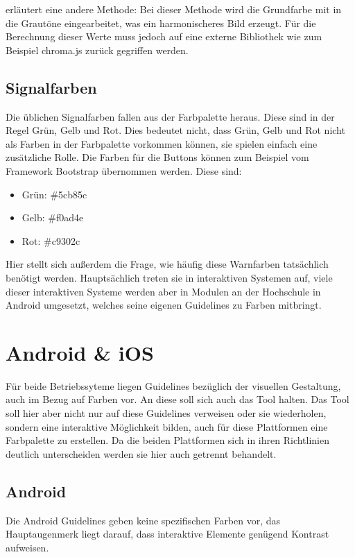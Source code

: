 \cite{elizabeth2016simple} erläutert eine andere Methode: Bei dieser Methode wird die Grundfarbe mit in die Grautöne eingearbeitet, was ein harmonischeres Bild erzeugt.  Für die Berechnung dieser Werte muss jedoch auf eine externe Bibliothek wie zum Beispiel chroma.js zurück gegriffen werden.

\subsection{Signalfarben}
Die üblichen Signalfarben fallen aus der Farbpalette heraus. Diese sind in der Regel Grün, Gelb und Rot. Dies bedeutet nicht, dass Grün, Gelb und Rot nicht als Farben in der Farbpalette vorkommen können, sie spielen einfach eine zusätzliche Rolle. Die Farben für die Buttons können zum Beispiel vom Framework Bootstrap übernommen werden. Diese sind:

\begin{itemize}
  \item Grün: \#5cb85c
  \item Gelb: \#f0ad4e
  \item Rot: \#c9302c
\end{itemize}

Hier stellt sich außerdem die Frage, wie häufig diese Warnfarben tatsächlich benötigt werden. Hauptsächlich treten sie in interaktiven Systemen auf, viele dieser interaktiven Systeme werden aber in Modulen an der Hochschule in Android umgesetzt, welches seine eigenen Guidelines zu Farben mitbringt.


\section{Android \& iOS}

Für beide Betriebssyteme liegen Guidelines bezüglich der visuellen Gestaltung, auch im Bezug auf Farben vor. An diese soll sich auch das Tool halten. Das Tool soll hier aber nicht nur auf diese Guidelines verweisen oder sie wiederholen, sondern eine interaktive Möglichkeit bilden, auch für diese Plattformen eine Farbpalette zu erstellen.
Da die beiden Plattformen sich in ihren Richtlinien deutlich unterscheiden werden sie hier auch getrennt behandelt.

\subsection{Android}
Die Android Guidelines geben keine spezifischen Farben vor, das Hauptaugenmerk liegt darauf, dass interaktive Elemente genügend Kontrast aufweisen.

